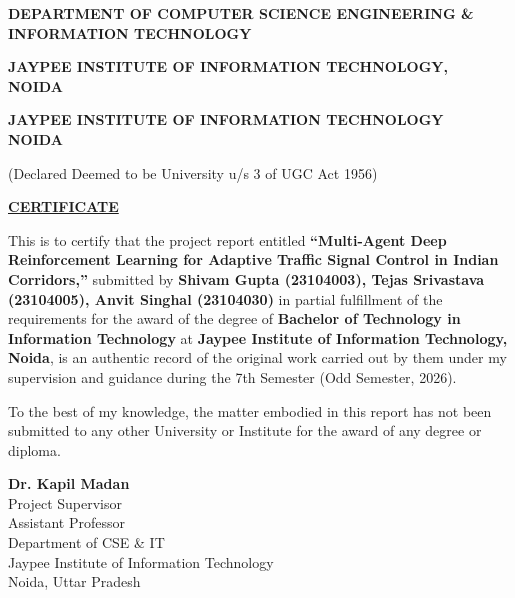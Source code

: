 \documentclass[12pt,a4paper,oneside]{report}
\begin{document}
\begin{center}
    \vspace{0.8cm}
    {\fontsize{12}{15}\bfseries DEPARTMENT OF COMPUTER SCIENCE ENGINEERING \&\\INFORMATION TECHNOLOGY\par}
    \vspace{0.15cm}
    {\fontsize{13}{16}\bfseries JAYPEE INSTITUTE OF INFORMATION TECHNOLOGY,\\NOIDA\par}
\end{center}

\newpage
\thispagestyle{empty}

\begin{center}
    {\fontsize{16}{20}\bfseries JAYPEE INSTITUTE OF INFORMATION TECHNOLOGY\\NOIDA\par}
    \vspace{0.3cm}
    {\fontsize{12}{15}\selectfont (Declared Deemed to be University u/s 3 of UGC Act 1956)\par}
    \vspace{1.5cm}
    {\fontsize{16}{20}\bfseries\underline{CERTIFICATE}\par}
\end{center}

\vspace{1.0cm}
\noindent This is to certify that the project report entitled \textbf{``Multi-Agent Deep Reinforcement Learning for Adaptive Traffic Signal Control in Indian Corridors,''} submitted by \textbf{Shivam Gupta (23104003), Tejas Srivastava (23104005), Anvit Singhal (23104030)} in partial fulfillment of the requirements for the award of the degree of \textbf{Bachelor of Technology in Information Technology} at \textbf{Jaypee Institute of Information Technology, Noida}, is an authentic record of the original work carried out by them under my supervision and guidance during the 7th Semester (Odd Semester, 2026).

\vspace{0.8cm}
\noindent To the best of my knowledge, the matter embodied in this report has not been submitted to any other University or Institute for the award of any degree or diploma.

\vspace{3.5cm}
\noindent
\begin{minipage}[t]{0.55\textwidth}
    \textbf{Dr. Kapil Madan}\\
    Project Supervisor\\
    Assistant Professor\\
    Department of CSE \& IT\\
    Jaypee Institute of Information Technology\\
    Noida, Uttar Pradesh
\end{minipage}
\end{document}

